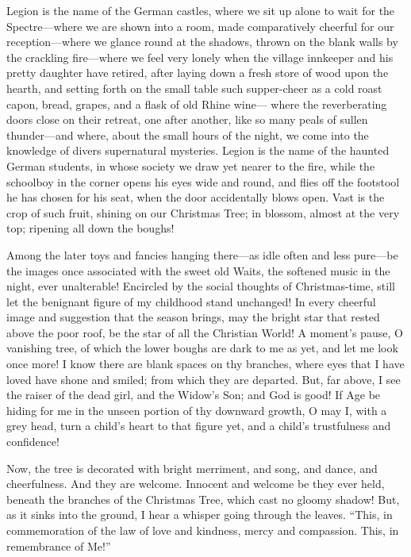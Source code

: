 Legion is the name of the German castles, where we sit up alone to
wait for the Spectre---where we are shown into a room, made
comparatively cheerful for our reception---where we glance round at
the shadows, thrown on the blank walls by the crackling fire---where
we feel very lonely when the village innkeeper and his pretty
daughter have retired, after laying down a fresh store of wood upon
the hearth, and setting forth on the small table such supper-cheer
as a cold roast capon, bread, grapes, and a flask of old Rhine wine---%
where the reverberating doors close on their retreat, one after
another, like so many peals of sullen thunder---and where, about the
small hours of the night, we come into the knowledge of divers
supernatural mysteries.  Legion is the name of the haunted German
students, in whose society we draw yet nearer to the fire, while the
schoolboy in the corner opens his eyes wide and round, and flies off
the footstool he has chosen for his seat, when the door accidentally
blows open.  Vast is the crop of such fruit, shining on our
Christmas Tree; in blossom, almost at the very top; ripening all
down the boughs!

Among the later toys and fancies hanging there---as idle often and
less pure---be the images once associated with the sweet old Waits,
the softened music in the night, ever unalterable!  Encircled by the
social thoughts of Christmas-time, still let the benignant figure of
my childhood stand unchanged!  In every cheerful image and
suggestion that the season brings, may the bright star that rested
above the poor roof, be the star of all the Christian World!  A
moment's pause, O vanishing tree, of which the lower boughs are dark
to me as yet, and let me look once more!  I know there are blank
spaces on thy branches, where eyes that I have loved have shone and
smiled; from which they are departed.  But, far above, I see the
raiser of the dead girl, and the Widow's Son; and God is good!  If
Age be hiding for me in the unseen portion of thy downward growth, O
may I, with a grey head, turn a child's heart to that figure yet,
and a child's trustfulness and confidence!

Now, the tree is decorated with bright merriment, and song, and
dance, and cheerfulness.  And they are welcome.  Innocent and
welcome be they ever held, beneath the branches of the Christmas
Tree, which cast no gloomy shadow!  But, as it sinks into the
ground, I hear a whisper going through the leaves.  ``This, in
commemoration of the law of love and kindness, mercy and compassion.
This, in remembrance of Me!''



